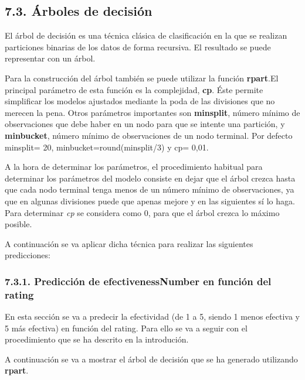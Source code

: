 \documentclass[spanish,]{article}
\begin{document}
\subsection{7.3. Árboles de decisión}\label{arboles-de-decision}

El árbol de decisión es una técnica clásica de clasificación en la que
se realizan particiones binarias de los datos de forma recursiva. El
resultado se puede representar con un árbol.

Para la construcción del árbol también se puede utilizar la función
\textbf{rpart}.El principal parámetro de esta función es la complejidad,
\textbf{cp}. Éste permite simplificar los modelos ajustados mediante la
poda de las divisiones que no merecen la pena. Otros parámetros
importantes son \textbf{minsplit}, número mínimo de observaciones que
debe haber en un nodo para que se intente una partición, y
\textbf{minbucket}, número mínimo de observaciones de un nodo terminal.
Por defecto minsplit= 20, minbucket=round(minsplit/3) y cp= 0,01.

A la hora de determinar los parámetros, el procedimiento habitual para
determinar los parámetros del modelo consiste en dejar que el árbol
crezca hasta que cada nodo terminal tenga menos de un número mínimo de
observaciones, ya que en algunas divisiones puede que apenas mejore y en
las siguientes sí lo haga. Para determinar \emph{cp} se considera como
0, para que el árbol crezca lo máximo posible.

A continuación se va aplicar dicha técnica para realizar las siguientes
predicciones:

\subsubsection{7.3.1. Predicción de efectivenessNumber en función del
rating}\label{prediccion-de-efectivenessnumber-en-funcion-del-rating}

En esta sección se va a predecir la efectividad (de 1 a 5, siendo 1
menos efectiva y 5 más efectiva) en función del rating. Para ello se va
a seguir con el procedimiento que se ha descrito en la introdución.

A continuación se va a mostrar el árbol de decisión que se ha generado
utilizando \textbf{rpart}.
\end{document}
